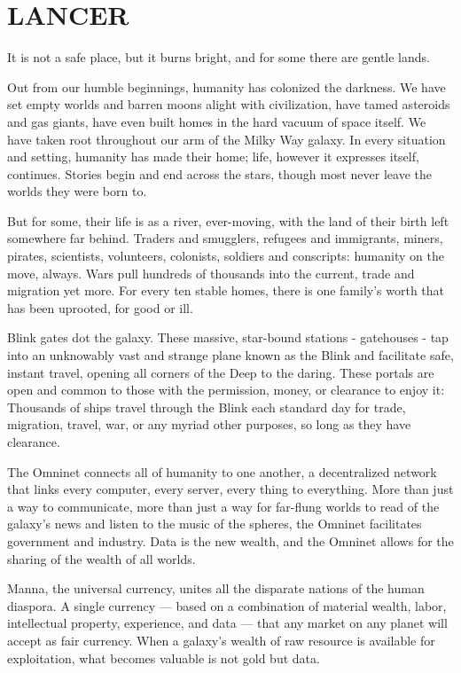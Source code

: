 \chapter{LANCER}
 It is not a safe place,
but it burns bright, and for some there are gentle lands.

Out from our humble beginnings, humanity has colonized the darkness. We have set empty
worlds and barren moons alight with civilization, have tamed asteroids and gas giants, have even
built homes in the hard vacuum of space itself. We have taken root throughout our arm of the
Milky Way galaxy. In every situation and setting, humanity has made their home; life, however it
expresses itself, continues. Stories begin and end across the stars, though most never leave the
worlds they were born to.

But for some, their life is as a river, ever-moving, with the land of their birth left somewhere far
behind. Traders and smugglers, refugees and immigrants, miners, pirates, scientists, volunteers,
colonists, soldiers and conscripts: humanity on the move, always. Wars pull hundreds of
thousands into the current, trade and migration yet more. For every ten stable homes, there is
one family’s worth that has been uprooted, for good or ill.

Blink gates dot the galaxy. These massive, star-bound stations - gatehouses - tap into an
unknowably vast and strange plane known as the Blink and facilitate safe, instant travel, opening
all corners of the Deep to the daring. These portals are open and common to those with the
permission, money, or clearance to enjoy it: Thousands of ships travel through the Blink each
standard day for trade, migration, travel, war, or any myriad other purposes, so long as they have
clearance.

The Omninet connects all of humanity to one another, a decentralized network that links every
computer, every server, every thing to everything. More than just a way to communicate, more
than just a way for far-flung worlds to read of the galaxy’s news and listen to the music of the
spheres, the Omninet facilitates government and industry. Data is the new wealth, and the
Omninet allows for the sharing of the wealth of all worlds.

Manna, the universal currency, unites all the disparate nations of the human diaspora. A single
currency — based on a combination of material wealth, labor, intellectual property, experience,
and data — that any market on any planet will accept as fair currency. When a galaxy’s wealth of
raw resource is available for exploitation, what becomes valuable is not gold but data.

